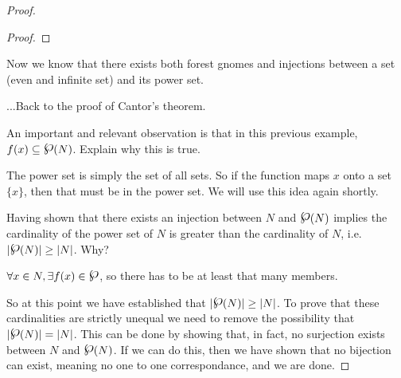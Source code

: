 \begin{proof}
\begin{example}[$f: X\mapsto Y$ such that for $x\in X, ~~f(x)  = \{x\}$.]
\begin{proof}
\end{proof}
Now we know that there exists both forest gnomes and injections between a set (even and infinite set) and its power set. \label{injection01}
\end{example}

...Back to the proof of Cantor's theorem.
\begin{remark} An important and relevant observation is that in this previous example, $f(x)	\subseteq \powerset (N)$.  Explain why this is true.


\ifKey\hfill\begin{minipage}{0.5\textwidth}\color{red}
The power set is simply the set of all sets.  So if the function maps $x$ onto a set $\{x \}$, then that must be in the power set.  We will use this idea again shortly.
\color{black}\end{minipage}
\fi
\end{remark}

\begin{problem} 
Having shown that there exists an injection between $N$ and $\powerset (N)$ implies the cardinality of the power set of $N$ is greater than the cardinality of $N$, i.e. $\left| \powerset (N) \right| \ge \left | N\right|$.  Why?

\ifKey\hfill\begin{minipage}{0.5\textwidth}\color{red}$\forall x\in N, \exists f(x)\in\powerset$, so there has to be at least that many members.
\color{black}\end{minipage}
\fi 
\end{problem}

So at this point we have established that $\left| \powerset (N) \right| \ge \left | N\right|$.  To prove that these cardinalities are strictly unequal we need to remove the possibility that $\left| \powerset (N) \right| = \left | N\right|$.  This can be done by showing that, in fact, no surjection exists between $N$ and $\powerset (N)$.  If we can do this, then we have shown that no bijection can exist, meaning no one to one correspondance, and we are done.  



\end{proof}
